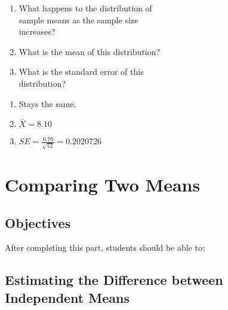 \documentclass[11pt]{book}\usepackage[]{graphicx}\usepackage[]{color}
\begin{document}
\begin{exercises}
\begin{exercise}
\begin{enumerate}
  \item What happens to the distribution of \\ sample means as the sample size \\ increases?
  \item What is the mean of this distribution? 
  \item What is the standard error of this \\ distribution?
\end{enumerate}

\end{exercise}  
\begin{solution}  %

\begin{enumerate}
  \item Stays the same.
  \item $\bar{X} = 8.10$
  \item $ SE = \frac{0.70}{\sqrt{12}} = 0.2020726$ 
\end{enumerate}

\end{solution}


\end{exercises}

\onecolumn



\chapter{Comparing Two Means}
\label{chap:ch12}

\section{Objectives}

After completing this part, students should be able to:


\section{Estimating the Difference between Independent Means}  
\end{document}
